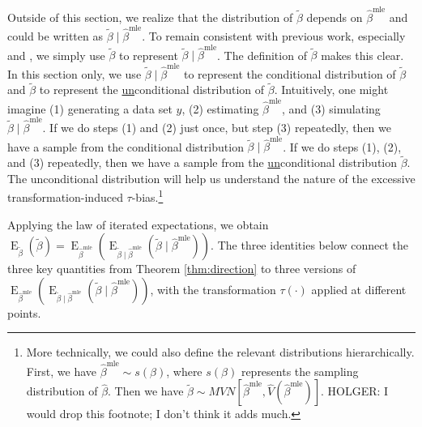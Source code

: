 \documentclass[11pt]{article}
\DeclareMathOperator*{\E}{\text{E}}
\begin{document}
Outside of this section, we realize that the distribution of $\tilde{\beta}$ depends on $\hat{\beta}^\text{mle}$ and could be written as $\tilde{\beta} \mid \hat{\beta}^\text{mle}$.
To remain consistent with previous work, especially \cite{KingTomzWittenberg2000} and \cite{Herron1999}, we simply use $\tilde{\beta}$ to represent $\tilde{\beta} \mid \hat{\beta}^\text{mle}$.
The definition of $\tilde{\beta}$ makes this clear.
In this section only, we use $\tilde{\beta} \mid \hat{\beta}^\text{mle}$ to represent the conditional distribution of $\tilde{\beta}$ and $\tilde{\beta}$ to represent the \underline{un}conditional distribution of $\tilde{\beta}$.
Intuitively, one might imagine (1) generating a data set $y$, (2) estimating $\hat{\beta}^\text{mle}$, and (3) simulating $\tilde{\beta} \mid \hat{\beta}^\text{mle}$.
If we do steps (1) and (2) just once, but step (3) repeatedly, then we have a sample from the conditional distribution $\tilde{\beta} \mid \hat{\beta}^\text{mle}$.
If we do steps (1), (2), and (3) repeatedly, then we have a sample from the \underline{un}conditional distribution $\tilde{\beta}$.
The unconditional distribution will help us understand the nature of the excessive transformation-induced $\tau$-bias.\footnote{More technically, we could also define the relevant distributions hierarchically.
First, we have $\hat{\beta}^\text{mle} \sim s(\beta)$, where $s(\beta)$ represents the sampling distribution of $\hat{\beta}$.
Then we have $\tilde{\beta} \sim MVN \left[ \hat{\beta}^{\text{mle}}, \hat{V} \left( \hat{\beta}^{\text{mle}} \right) \right]$.
{\color{red} HOLGER: I would drop this footnote; I don't think it adds much.}}

Applying the law of iterated expectations, we obtain $\E_{\tilde{\beta}} \left( \tilde{\beta} \right) = \E_{\hat{\beta}^\text{mle}}\left( \E_{\tilde{\beta} \mid \hat{\beta}^\text{mle}} (\tilde{\beta} \mid \hat{\beta}^\text{mle}) \right)$.
The three identities below connect the three key quantities from Theorem \ref{thm:direction} to three versions of $\E_{\hat{\beta}^\text{mle}}\left( \E_{\tilde{\beta} \mid \hat{\beta}^\text{mle}} (\tilde{\beta} \mid \hat{\beta}^\text{mle}) \right)$, with the transformation $\tau(\cdot)$ applied at different points.
\end{document}

